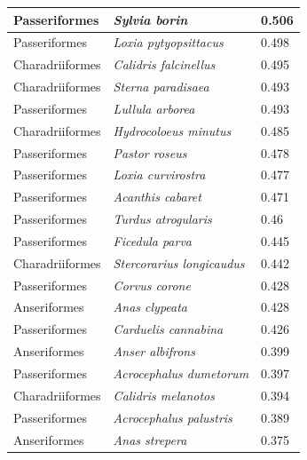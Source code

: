 \documentclass{article}
\begin{document}
\begin{longtable}{|p{} | p{} | p{} |}
  Passeriformes   & \textit{Sylvia borin}                  & 0.506                \\ \hline
  Passeriformes   & \textit{Loxia pytyopsittacus}          & 0.498                \\ \hline
  Charadriiformes & \textit{Calidris falcinellus}          & 0.495                \\ \hline
  Charadriiformes & \textit{Sterna paradisaea}             & 0.493                \\ \hline
  Passeriformes   & \textit{Lullula arborea}               & 0.493                \\ \hline
  Charadriiformes & \textit{Hydrocoloeus minutus}          & 0.485                \\ \hline
  Passeriformes   & \textit{Pastor roseus}                 & 0.478                \\ \hline
  Passeriformes   & \textit{Loxia curvirostra}             & 0.477                \\ \hline
  Passeriformes   & \textit{Acanthis cabaret}              & 0.471                \\ \hline
  Passeriformes   & \textit{Turdus atrogularis}            & 0.46                 \\ \hline
  Passeriformes   & \textit{Ficedula parva}                & 0.445                \\ \hline
  Charadriiformes & \textit{Stercorarius longicaudus}      & 0.442                \\ \hline
  Passeriformes   & \textit{Corvus corone}                 & 0.428                \\ \hline
  Anseriformes    & \textit{Anas clypeata}                 & 0.428                \\ \hline
  Passeriformes   & \textit{Carduelis cannabina}           & 0.426                \\ \hline
  Anseriformes    & \textit{Anser albifrons}               & 0.399                \\ \hline
  Passeriformes   & \textit{Acrocephalus dumetorum}        & 0.397                \\ \hline
  Charadriiformes & \textit{Calidris melanotos}            & 0.394                \\ \hline
  Passeriformes   & \textit{Acrocephalus palustris}        & 0.389                \\ \hline
  Anseriformes    & \textit{Anas strepera}                 & 0.375                \\ \hline

\end{longtable}
\end{document}
